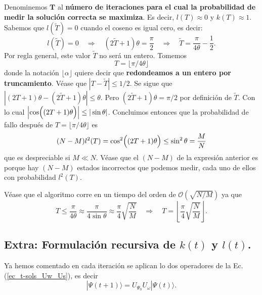 \documentclass[a4paper,11pt]{book} %
\numberwithin{equation}{chapter}
\def\Lp{\Bigl(}
\def\Rp{\Bigr)}
\def\rqa{\quad \Rightarrow \quad}
\begin{document}
Denominemos $\bm T$ al \textbf{número de iteraciones para el cual la probabilidad de medir la solución correcta se maximiza}. Es decir, $l(T) \approx 0$ y $k(T) \approx 1$. Sabemos que $l(\tilde{T}) =0$ cuando el coseno es igual cero, es decir:
\begin{equation}
l(\tilde{T}) = 0 \rqa (2\tilde{T}+1) \theta = \frac{\pi}{2} \rqa \tilde{T} = \frac{\pi}{4 \theta} - \frac{1}{2}.
\end{equation}
Por regla general, este valor $\tilde{T}$ no será un entero. Tomemos 
\begin{equation} 
T = \lfloor \pi / 4 \theta \rfloor
\end{equation}
donde la notación $\lfloor \alpha \rfloor$ quiere decir que \textbf{redondeamos a un entero por truncamiento}. Véase que $|T-\tilde{T}| \leq 1/2$. Se sigue que $|(2T+1)\theta - (2\tilde{T}+1)\theta | \leq \theta $. Pero $(2 \tilde{T}+1) \theta = \pi/2$ por definición de $\tilde{T}$. Con lo cual $\left| \cos \Lp (2T+1) \theta \Rp \right| \leq | \sin \theta |$. Concluimos entonces que la probabilidad de fallo después de $T = \lfloor \pi / 4 \theta \rfloor$ es 
\begin{equation}
(N-M)l^2(T) = \cos^2 \Lp (2T+1) \theta \Rp \leq \sin^2 \theta = \frac{M}{N}
\end{equation}
que es despreciable si $M \ll N$. Véase que el $(N-M)$ de la expresión anterior es porque hay $(N-M)$ estados incorrectos que podemos medir, cada uno de ellos con probabilidad $l^2(T)$.

Véase que el algoritmo corre en un tiempo del orden de $\mathcal{O}(\sqrt{N/M})$ ya que
\begin{equation} \label{ec_t-sols_m}
T \leq \frac{\pi}{4 \theta} \approx \frac{\pi}{4 \sin \theta} \approx \frac{\pi}{4} \sqrt{\frac{N}{M}} \rqa \boxed{T = \left\lfloor \frac{\pi}{4} \sqrt{\frac{N}{M}} \right\rfloor}.
\end{equation}


\subsection{Extra: Formulación recursiva de $k(t)$ y $l(t)$.}

Ya hemos comentado en cada iteración se aplican lo dos operadores de la Ec. (\ref{ec_t-sols_Uw_Us}), es decir
\begin{equation} \label{ec_t-sols_Psi_j+1_j}
|\Psi{(t+1)} \rangle = U_{\Psi_0} U_\omega |\Psi(t) \rangle.
\end{equation}
\end{document}
